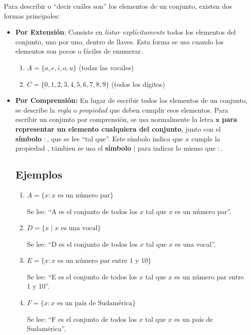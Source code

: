 \documentclass[12pt]{article}
\begin{document}
Para describir o “decir cuáles son” los elementos de un conjunto, existen dos formas principales:

\begin{itemize}

\item \textbf{Por Extensión}: Consiste en \textit{listar explícitamente} todos los elementos del conjunto, uno por uno, dentro de llaves.  
Esta forma se usa cuando los elementos son pocos o fáciles de enumerar.

\begin{enumerate}
    \item \( A = \{a, e, i, o, u\} \) \qquad (todas las vocales)
    \item \( C = \{0,1,2,3,4,5,6,7,8,9\} \) \qquad(todos los dígitos)
\end{enumerate}

\item \textbf{Por Comprensión:} En lugar de escribir todos los elementos de un conjunto, se describe la 
\textit{regla} o \textit{propiedad} que deben cumplir esos elementos. Para escribir un conjunto por comprensión, se usa normalmente la letra \(\mathbf{x}\) \textbf{para representar 
un elemento cualquiera del conjunto}, junto con el \textbf{símbolo }\( \mathbf{:} \), que se lee ``tal que''. 
Este símbolo indica que \(x\) cumple la propiedad , támbien se usa el \textbf{símbolo} $|$ para indicar lo mismo que $:$.

\subsection*{Ejemplos}


\begin{enumerate}
    \item $
A = \{x : x \text{ es un número par}\}
$

Se lee: ``A es el conjunto de todos los \(x\) tal que \(x\) es un número par''.
    \item \( D = \{x \mid x \text{ es una vocal}\} \)
    
    Se lee: ``D es el conjunto de todos los \(x\) tal que \(x\) es una vocal''.
    \item \( E = \{x : x \text{ es un número par entre 1 y 10}\} \)
    
    Se lee: ``E es el conjunto de todos los \(x\) tal que \(x\) es un número par entre 1 y 10''.
    \item \( F = \{x : x \text{ es un país de Sudamérica}\} \)
    
    Se lee: ``F es el conjunto de todos los \(x\) tal que \(x\) es un país de Sudamérica''.
\end{enumerate}
\end{itemize}
\end{document}
